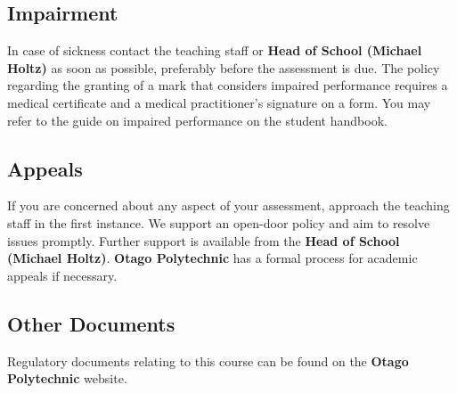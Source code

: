 \documentclass{article}
\begin{document}
\subsection*{Impairment}
In case of sickness contact the teaching staff or \textbf{Head of School (Michael Holtz)} as soon as possible, preferably before the assessment is due. The policy regarding the granting of a mark that considers impaired performance requires a medical certificate and a medical practitioner’s signature on a form. You may refer to the guide on impaired performance on the student handbook.

\subsection*{Appeals}
If you are concerned about any aspect of your assessment, approach the teaching staff in the first instance. We support an open-door policy and aim to resolve issues promptly. Further support is available from the \textbf{Head of School (Michael Holtz)}. \textbf{Otago Polytechnic} has a formal process for academic appeals if necessary.

\subsection*{Other Documents}
Regulatory documents relating to this course can be found on the \textbf{Otago Polytechnic} website.
\end{document}
